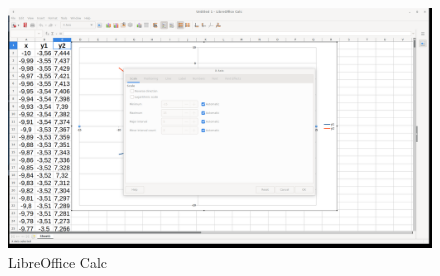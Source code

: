 \begin{figure}[h!]		
	\centering
   	\includegraphics[width=8.0in]{pictures/picture_018.png}
  	\caption{LibreOffice Calc}
   	\label{fig:LibreOfficeCalc018}
\end{figure}